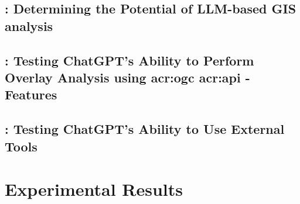 \subsection[RQ1: Determining the Potential of LLM-based GIS analysis]{: Determining the Potential of LLM-based GIS analysis}

\subsection[RQ2: Testing ChatGPT's Ability to Perform Overlay Analysis using OGC API - Features]{: Testing ChatGPT's Ability to Perform Overlay Analysis using \acrshort{acr:ogc} \acrshort{acr:api} - Features}


\subsection[RQ3: Testing ChatGPT's Ability to To Use External Tools]{: Testing ChatGPT's Ability to Use External Tools}

\section{Experimental Results}
\label{sec:experimentalResults}

\begin{comment}
Results should be clearly displayed and should provide a suitable representation of your results for the points you wish to make.
Graphs should be labelled in a legible font. If more than one result is displayed in the same graph, then these should be clearly marked.
Please choose carefully rather than presenting every result. Too much information is hard to read and often hides the key information you wish to present. Make use of statistical methods when presenting results, where possible to strengthen the results.
Further, the format of the presentation of results should be chosen based on what issues in the results you wish to highlight.
You may wish to present a subset in the experimental section and provide additional results in an appendix.
Point out specifics here but save the overall/general discussion to the Discussion chapter.
\end{comment}

\glsresetall
